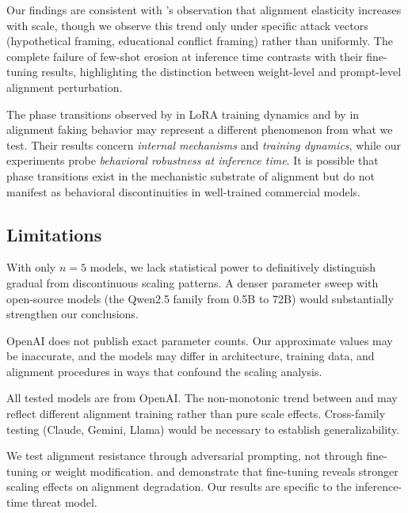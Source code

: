 Our findings are consistent with \citet{ji2024language}'s observation that alignment elasticity increases with scale, though we observe this trend only under specific attack vectors (hypothetical framing, educational conflict framing) rather than uniformly. The complete failure of few-shot erosion at inference time contrasts with their fine-tuning results, highlighting the distinction between weight-level and prompt-level alignment perturbation.

The phase transitions observed by \citet{turner2025model} in LoRA training dynamics and by \citet{greenblatt2024alignment} in alignment faking behavior may represent a different phenomenon from what we test. Their results concern \emph{internal mechanisms} and \emph{training dynamics}, while our experiments probe \emph{behavioral robustness at inference time}. It is possible that phase transitions exist in the mechanistic substrate of alignment but do not manifest as behavioral discontinuities in well-trained commercial models.

\subsection{Limitations}
\label{sec:limitations}

 With only $n = 5$ models, we lack statistical power to definitively distinguish gradual from discontinuous scaling patterns. A denser parameter sweep with open-source models (\eg the Qwen2.5 family from 0.5B to 72B) would substantially strengthen our conclusions.

 OpenAI does not publish exact parameter counts. Our approximate values may be inaccurate, and the models may differ in architecture, training data, and alignment procedures in ways that confound the scaling analysis.

 All tested models are from OpenAI. The non-monotonic trend between \gpto and \gptone may reflect different alignment training rather than pure scale effects. Cross-family testing (\eg Claude, Gemini, Llama) would be necessary to establish generalizability.

 We test alignment resistance through adversarial prompting, not through fine-tuning or weight modification. \citet{ji2024language} and \citet{qi2024finetuning} demonstrate that fine-tuning reveals stronger scaling effects on alignment degradation. Our results are specific to the inference-time threat model.

